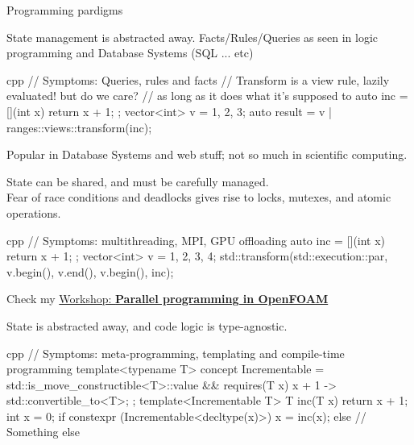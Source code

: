 \begin{frame}{Programming pardigms}
\begin{description}
        State management is abstracted away. Facts/Rules/Queries as seen in logic
        programming and Database Systems (SQL ... etc)
\begin{CodeEnvNoComment}{cpp}{\scriptsize}
// Symptoms: Queries, rules and facts
// Transform is a view rule, lazily evaluated! but do we care?
// as long as it does what it's supposed to
auto inc = [](int x) { return x + 1; };
vector<int> v = {1, 2, 3};
auto result = v | ranges::views::transform(inc);
\end{CodeEnvNoComment}
        Popular in Database Systems and web stuff; not so much in scientific computing.
    \item[Parallel Programming\hspace{2cm}] \hspace{\linewidth} 
        State can be shared, and must be carefully managed.\\
        Fear of race conditions and deadlocks gives rise to locks, mutexes, and atomic operations.\\
\begin{CodeEnvNoComment}{cpp}{\scriptsize}
// Symptoms: multithreading, MPI, GPU offloading
auto inc = [](int x) { return x + 1; };
vector<int> v = {1, 2, 3, 4};
std::transform(std::execution::par, v.begin(), v.end(), v.begin(), inc);
\end{CodeEnvNoComment}
        Check my \href{https://openfoam-parallelisation-course.github.io/}{Workshop: \bf Parallel programming in OpenFOAM}
    \item[Generic Programming\hspace{2cm}] \hspace{\linewidth} 
        State is abstracted away, and code logic is type-agnostic.
\begin{CodeEnvNoComment}{cpp}{\scriptsize}
// Symptoms: meta-programming, templating and compile-time programming
template<typename T>
concept Incrementable = std::is_move_constructible<T>::value
    && requires(T x) { { x + 1 } -> std::convertible_to<T>; };
template<Incrementable T> T inc(T x) { return x + 1; }
int x = 0;
if constexpr (Incrementable<decltype(x)>) {
    x = inc(x);
} else {
    // Something else
}
\end{CodeEnvNoComment}
\end{description}

\end{frame}
